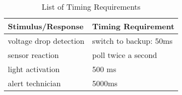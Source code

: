 \documentclass[10pt,a4paper,titlepage,draft]{article} %
\begin{document}
\begin{table}[htbp]
\begin{tabular}{|p{4cm}|p{7.2cm}|}
\hline %
\rowcolor{gray} Stimulus/Response & Timing Requirement \\
\hline %
voltage drop detection & switch to backup: 50ms \\
\hline %
sensor reaction & poll twice a second \\
\hline %
light activation & 500 ms \\
\hline %
alert technician & 5000ms \\
\hline %
\end{tabular}
\caption{List of Timing Requirements}
\label{tab:radTime}
\end{table}


%
\end{document}
